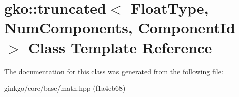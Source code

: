 \hypertarget{classgko_1_1truncated}{}\section{gko\+:\+:truncated$<$ Float\+Type, Num\+Components, Component\+Id $>$ Class Template Reference}
\label{classgko_1_1truncated}


The documentation for this class was generated from the following file\+:\begin{DoxyCompactItemize}
\item 
ginkgo/core/base/math.\+hpp (f1a4eb68)\end{DoxyCompactItemize}
